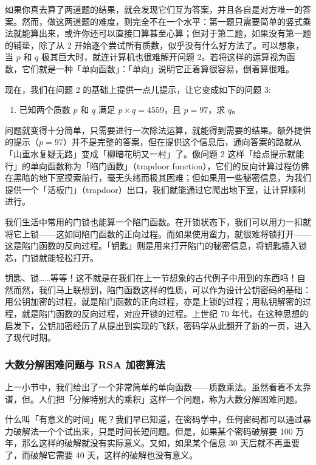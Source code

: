 如果你真去算了两道题的结果，就会发现它们互为答案，并且各自是对方唯一的答案。然而，做这两道题的难度，则完全不在一个水平：第一题只需要简单的竖式乘法就能算出来，或许你还可以直接口算甚至心算；但对于第二题，如果没有第一题的铺垫，除了从 2 开始逐个尝试所有质数，似乎没有什么好方法了。可以想象，当 $p$ 和 $q$ 极其巨大时，就连计算机也很难解开问题 2。若将这样的运算视为函数，它们就是一种「单向函数」：「单向」说明它正着算很容易，倒着算很难。

现在，我们在问题 2 的基础上提供一点儿提示，让它变成如下的问题 3:
\begin{enumerate}
  \item[3.] 已知两个质数 $p$ 和 $q$ 满足 $p\times q=4559$，且 $p=97$，求 $q$。
\end{enumerate}
问题就变得十分简单，只需要进行一次除法运算，就能得到需要的结果。额外提供的提示（$p=97$）并不是完整的答案，但在提供这个信息后，通向答案的路就从「山重水复疑无路」变成「柳暗花明又一村」了。像问题 2 这样「给点提示就能行」的单向函数称为「陷门函数」（trapdoor function），它们的反向计算过程仿佛在黑暗的地下室摸索前行，毫无头绪而极其困难；但如果用一些秘密信息，为我们提供一个「活板门」（trapdoor）出口，我们就能通过它爬出地下室，让计算顺利进行。

我们生活中常用的门锁也能算一个陷门函数。在开锁状态下，我们可以用力一扣就将它上锁——这如同陷门函数的正向过程。而如果使用蛮力，就很难将锁打开——这是陷门函数的反向过程。「钥匙」则是用来打开陷门的秘密信息，将钥匙插入锁芯，门锁就能轻松打开。

钥匙、锁……等等！这不就是在我们在上一节想象的古代例子中用到的东西吗！自然而然，我们马上联想到，陷门函数这样的性质，可以作为设计公钥密码的基础：用公钥加密的过程，就是陷门函数的正向过程，亦是上锁的过程；用私钥解密的过程，就是陷门函数的反向过程，对应开锁的过程。上世纪 70 年代，在这种思想的启发下，公钥加密经历了从提出到实现的飞跃，密码学从此翻开了新的一页，进入了现代时期。

\subsubsection{大数分解困难问题与 RSA 加密算法}

上一小节中，我们给出了一个非常简单的单向函数——质数乘法。虽然看着不太靠谱，但。人们把「分解特别大的乘积」这样一个问题，称为大数分解困难问题。

\begin{note}
  什么叫「有意义的时间」呢？我们早已知道，在密码学中，任何密码都可以通过暴力破解法一个个试出来，只是时间长短问题。但是，如果某个密码破解要 100 万年，那么这样的破解就没有实际意义。又如，如果某个信息 30 天后就不再重要了，而破解它需要 40 天，这样的破解也没有意义。
\end{note}

